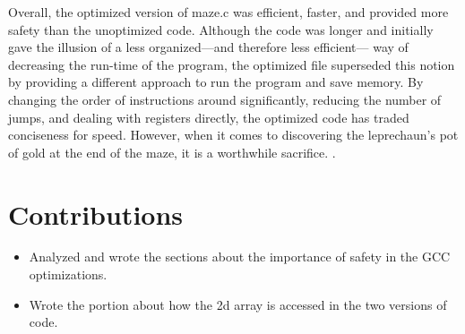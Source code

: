 \documentclass[12pt,letterpaper]{article}
\begin{document}
Overall, the optimized version of maze.c was efficient, faster, and provided 
more safety than the unoptimized code. Although the code was longer and 
initially gave the illusion of a less organized---and therefore less efficient---
way of decreasing the run-time of the program, the optimized file superseded 
this notion by providing a different approach to run the program and save memory.
By changing the order of instructions around significantly, reducing the number of 
jumps, and dealing with registers directly, the optimized code has traded conciseness 
for speed. However, when it comes to discovering the leprechaun's pot of gold at 
the end of the maze, it is a worthwhile sacrifice. 
\newpage
\appendix .
\appendixpage
\section{Contributions}

\begin{itemize}
\item Analyzed and wrote the sections about the importance of safety in the GCC
      optimizations.
\item Wrote the portion about how the 2d array is accessed in the two versions
      of code.
\end{itemize}
\end{document}
